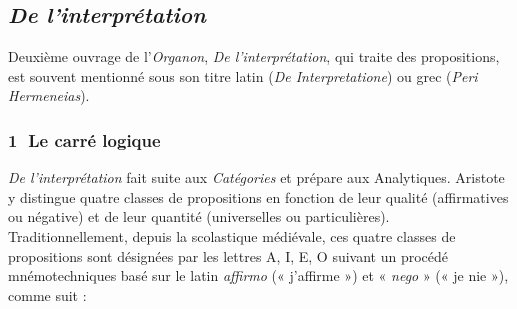 \subsection{\textit{De l’interprétation}}
Deuxième ouvrage de l’\textit{Organon}, \textit{De l’interprétation}, qui traite des propositions, est souvent mentionné sous son titre latin (\textit{De Interpretatione}) ou grec (\textit{Peri Hermeneias}).

\subsubsection*{\textcircled{\scriptsize 1} Le carré logique}
\textit{De l’interprétation} fait suite aux \textit{Catégories} et prépare aux Analytiques. Aristote y distingue quatre classes de propositions en fonction de leur qualité (affirmatives ou négative) et de leur quantité (universelles ou particulières). Traditionnellement, depuis la scolastique médiévale, ces quatre classes de propositions sont désignées par les lettres A, I, E, O suivant un procédé mnémotechniques basé sur le latin \textit{affirmo} (« j’affirme ») et « \textit{nego} » (« je nie »), comme suit :

